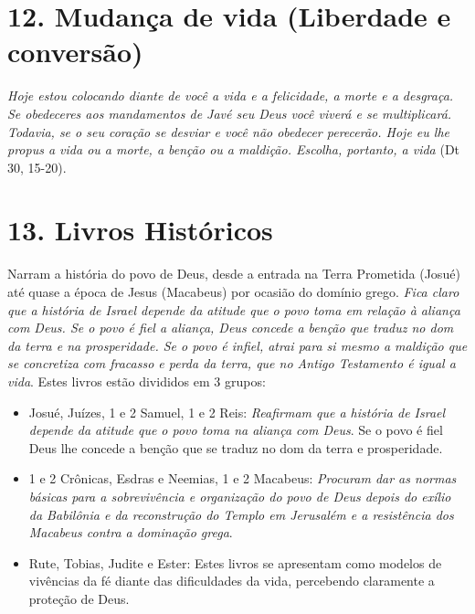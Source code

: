 \documentclass[
]{book}
\begin{document}
\hypertarget{mudanuxe7a-de-vida-liberdade-e-conversuxe3o}{%
\section*{12. Mudança de vida (Liberdade e conversão)}\label{mudanuxe7a-de-vida-liberdade-e-conversuxe3o}}

\emph{Hoje estou colocando diante de você a vida e a felicidade, a morte e a desgraça. Se obedeceres aos mandamentos de Javé seu Deus você viverá e se multiplicará. Todavia, se o seu coração se desviar e você não obedecer perecerão. Hoje eu lhe propus a vida ou a morte, a benção ou a maldição. Escolha, portanto, a vida} (Dt 30, 15-20).

\hypertarget{livros-histuxf3ricos}{%
\section*{13. Livros Históricos}\label{livros-histuxf3ricos}}

Narram a história do povo de Deus, desde a entrada na Terra Prometida (Josué) até quase a época de Jesus (Macabeus) por ocasião do domínio grego. \emph{Fica claro que a história de Israel depende da atitude que o povo toma em relação à aliança com Deus. Se o povo é fiel a aliança, Deus concede a benção que traduz no dom da terra e na prosperidade. Se o povo é infiel, atrai para si mesmo a maldição que se concretiza com fracasso e perda da terra, que no Antigo Testamento é igual a vida}. Estes livros estão divididos em 3 grupos:

\begin{itemize}
\item
  Josué, Juízes, 1 e 2 Samuel, 1 e 2 Reis: \emph{Reafirmam que a história de Israel depende da atitude que o povo toma na aliança com Deus}. Se o povo é fiel Deus lhe concede a benção que se traduz no dom da terra e prosperidade.
\item
  1 e 2 Crônicas, Esdras e Neemias, 1 e 2 Macabeus: \emph{Procuram dar as normas básicas para a sobrevivência e organização do povo de Deus depois do exílio da Babilônia e da reconstrução do Templo em Jerusalém e a resistência dos Macabeus contra a dominação grega}.
\item
  Rute, Tobias, Judite e Ester: Estes livros se apresentam como modelos de vivências da fé diante das dificuldades da vida, percebendo claramente a proteção de Deus.
\end{itemize}
\end{document}
